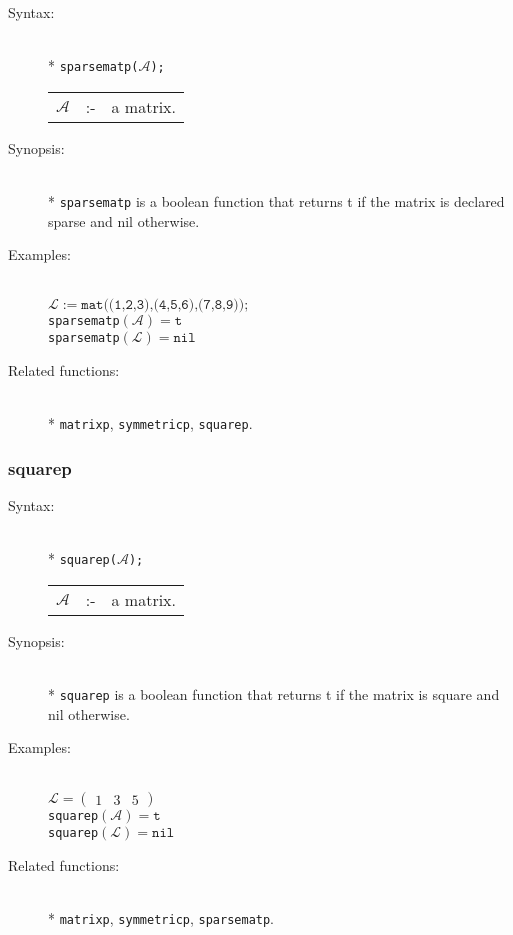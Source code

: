 \begin{description}
\item[Syntax:]\mbox{}\\*
\texttt{sparsematp($\mathcal{A}$);}\\[2mm]
\begin{tabular}{l l l}
$\mathcal{A}$ &:-& a matrix.
\end{tabular}

\item[Synopsis:]\mbox{}\\*
\texttt{sparsematp} is a boolean function that returns t if
                the matrix is declared sparse and nil otherwise.

\item[Examples:]\mbox{}\\
\(\mathcal{L} := \texttt{mat((1,2,3),(4,5,6),(7,8,9));}\) \\[2mm]
\texttt{sparsematp}\((\mathcal{A}) = \texttt{t}\) \\[2mm]
\texttt{sparsematp}\((\mathcal{L}) = \texttt{nil}\)

\item[Related functions:]\mbox{}\\*
\texttt{matrixp}, \texttt{symmetricp}, \texttt{squarep}.
\end{description}

\subsubsection{squarep}
\label{sparse:squarep}

\begin{description}
\item[Syntax:]\mbox{}\\*
\texttt{squarep($\mathcal{A}$);}\\[2mm]
\begin{tabular}{l l l}
$\mathcal{A}$ &:-& a matrix.
\end{tabular}

\item[Synopsis:]\mbox{}\\*
\texttt{squarep} is a boolean function that returns t if
                the matrix is square and nil otherwise.

\item[Examples:]\mbox{}\\
\(\mathcal{L} = \begin{pmatrix} 1 & 3 & 5 \end{pmatrix}\) \\[2mm]
\texttt{squarep}\((\mathcal{A}) = \texttt{t}\) \\[2mm]
\texttt{squarep}\((\mathcal{L}) = \texttt{nil}\)

\item[Related functions:]\mbox{}\\*
\texttt{matrixp}, \texttt{symmetricp}, \texttt{sparsematp}.
\end{description}


